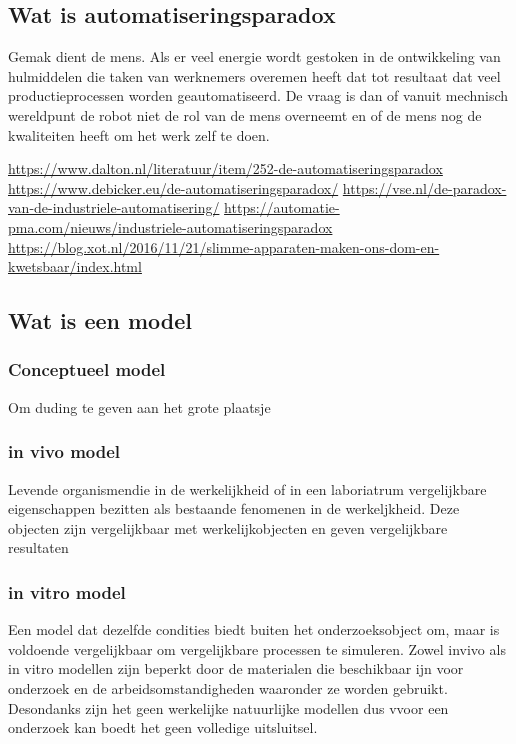 \subsection{Wat is automatiseringsparadox}
Gemak dient de mens. Als er veel energie wordt gestoken in de ontwikkeling van hulmiddelen die taken van werknemers overemen heeft dat tot resultaat dat veel productieprocessen worden geautomatiseerd. De vraag is dan of vanuit mechnisch wereldpunt de robot niet de rol van de mens overneemt en of de mens nog de kwaliteiten heeft om het werk zelf te doen.

\url{https://www.dalton.nl/literatuur/item/252-de-automatiseringsparadox}
\url{https://www.debicker.eu/de-automatiseringsparadox/}
\url{https://vse.nl/de-paradox-van-de-industriele-automatisering/}
\url{https://automatie-pma.com/nieuws/industriele-automatiseringsparadox}
\url{https://blog.xot.nl/2016/11/21/slimme-apparaten-maken-ons-dom-en-kwetsbaar/index.html}

\subsection{Wat is een model}
\subsubsection{Conceptueel model}
Om duding te geven aan het grote plaatsje
\subsubsection{in vivo model}
Levende organismendie in de werkelijkheid of in een laboriatrum vergelijkbare eigenschappen bezitten als bestaande fenomenen in de werkeljkheid. Deze objecten zijn vergelijkbaar met werkelijkobjecten en geven vergelijkbare resultaten
\subsubsection{in vitro model}
Een model dat dezelfde condities biedt  buiten het onderzoeksobject om, maar is voldoende vergelijkbaar om vergelijkbare processen te simuleren.
Zowel invivo als in vitro modellen zijn beperkt door de materialen die beschikbaar ijn voor onderzoek en de arbeidsomstandigheden waaronder ze worden gebruikt. Desondanks zijn het geen werkelijke natuurlijke modellen dus vvoor een onderzoek kan boedt het geen volledige uitsluitsel.
